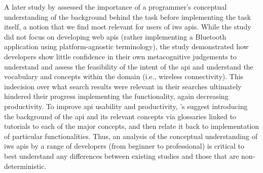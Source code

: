 A later study by \citet{Ko:2011fb} assessed the importance of a programmer's conceptual understanding of the background behind the task before implementing the task itself, a notion that we find most relevant for users of \gls{iws} \glspl{api}. While the study did not focus on developing web \glspl{api} (rather implementing a Bluetooth application using platform-agnostic terminology), the study demonstrated how developers show little confidence in their own metacognitive judgements to understand and assess the feasibility of the intent of the \gls{api} and understand the vocabulary and concepts within the domain (i.e., wireless connectivity). This indecision over what search results were relevant in their searches ultimately hindered their progress implementing the functionality, again decreasing productivity. To improve \gls{api} usability and productivity, \citeauthor{Ko:2011fb}'s suggest introducing the background of the \gls{api} and its relevant concepts via glossaries linked to tutorials to each of the major concepts, and then relate it back to implementation of particular functionalities. Thus, an analysis of the conceptual understanding of \gls{iws} \glspl{api} by a range of developers (from beginner to professional) is critical to best understand any differences between existing studies and those that are non-deterministic.

